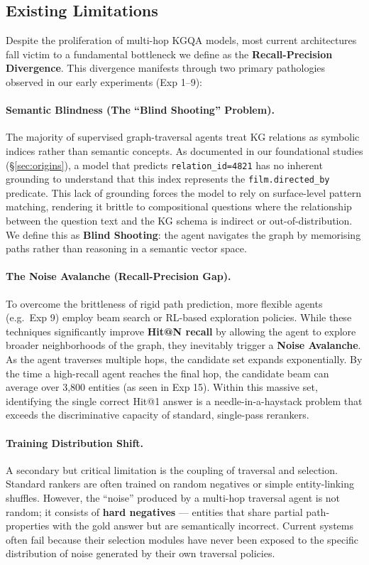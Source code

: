 \documentclass[11pt,a4paper]{article}
\makeatletter
\newcommand{\HitOne}{Hit@1}
\makeatother
\begin{document}
\subsection{Existing Limitations}
Despite the proliferation of multi-hop KGQA models, most current architectures
fall victim to a fundamental bottleneck we define as the \textbf{Recall-Precision
Divergence}. This divergence manifests through two primary pathologies observed
in our early experiments (Exp 1--9):

\paragraph{Semantic Blindness (The ``Blind Shooting'' Problem).}
The majority of supervised graph-traversal agents treat KG relations as
symbolic indices rather than semantic concepts.
As documented in our foundational studies (§\ref{sec:origins}), a model that
predicts \texttt{relation\_id=4821} has no inherent grounding to understand
that this index represents the \texttt{film.directed\_by} predicate.
This lack of grounding forces the model to rely on surface-level pattern
matching, rendering it brittle to compositional questions where the
relationship between the question text and the KG schema is indirect or
out-of-distribution.
We define this as \textbf{Blind Shooting}: the agent navigates the graph
by memorising paths rather than reasoning in a semantic vector space.

\paragraph{The Noise Avalanche (Recall-Precision Gap).}
To overcome the brittleness of rigid path prediction, more flexible agents
(e.g.\ Exp 9) employ beam search or RL-based exploration policies.
While these techniques significantly improve \textbf{Hit@N recall} by allowing
the agent to explore broader neighborhoods of the graph, they inevitably
trigger a \textbf{Noise Avalanche}.
As the agent traverses multiple hops, the candidate set expands exponentially.
By the time a high-recall agent reaches the final hop, the candidate beam can
average over 3,800 entities (as seen in Exp 15).
Within this massive set, identifying the single correct \HitOne{} answer is
a needle-in-a-haystack problem that exceeds the discriminative capacity of
standard, single-pass rerankers.

\paragraph{Training Distribution Shift.}
A secondary but critical limitation is the coupling of traversal and selection.
Standard rankers are often trained on random negatives or simple entity-linking
shuffles.
However, the ``noise'' produced by a multi-hop traversal agent is not random;
it consists of \textbf{hard negatives} --- entities that share partial
path-properties with the gold answer but are semantically incorrect.
Current systems often fail because their selection modules have never been
exposed to the specific distribution of noise generated by their own traversal
policies.
\end{document}
